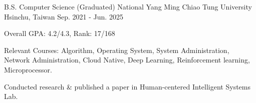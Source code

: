 

\begin{cventries}

  \cventry
    {B.S. Computer Science (Graduated)} %
    {National Yang Ming Chiao Tung University} %
    {Hsinchu, Taiwan} %
    {Sep. 2021 - Jun. 2025} %
    {
      \begin{cvitems} %
        \item {Overall GPA: 4.2/4.3, Rank: 17/168}
        \item {Relevant Courses: Algorithm, Operating System, System Administration, Network Administration, Cloud Native, Deep Learning, Reinforcement learning, Microprocessor.}
        \item {Conducted research \& published a paper in Human-centered Intelligent Systems Lab.}
      \end{cvitems}
    }

\end{cventries}
